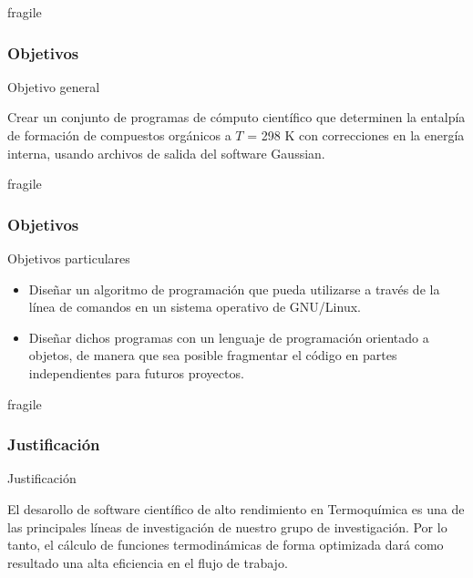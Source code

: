 \documentclass{beamer}
\begin{document}
\begin{frame}{fragile}
\frametitle{Objetivos}

\begin{block}{Objetivo general}

Crear un conjunto de programas de cómputo científico que determinen la entalpía de formación de compuestos orgánicos a $T$ = 298 K con correcciones en la energía interna, usando archivos de salida del software Gaussian.
\end{block}

\end{frame}


\begin{frame}{fragile}
\frametitle{Objetivos}

\begin{block}{Objetivos particulares}

\begin{itemize}

\item Diseñar un algoritmo de programación que pueda utilizarse a través de la línea de comandos en un sistema operativo de GNU/Linux.
\vspace{1cm}
\item Diseñar dichos programas con un lenguaje de programación orientado a objetos, de manera que sea posible fragmentar el código en partes independientes para futuros proyectos.

\end{itemize}
\end{block}
\end{frame}
\begin{frame}{fragile}
\frametitle{Justificación}

\begin{block}{Justificación}

El desarollo de software científico de alto rendimiento en Termoquímica es una de las principales líneas de investigación de nuestro grupo de investigación. Por lo tanto, el cálculo de funciones termodinámicas de forma optimizada dará como resultado una alta eficiencia en el flujo de trabajo.
\end{block}

\end{frame}
\end{document}
